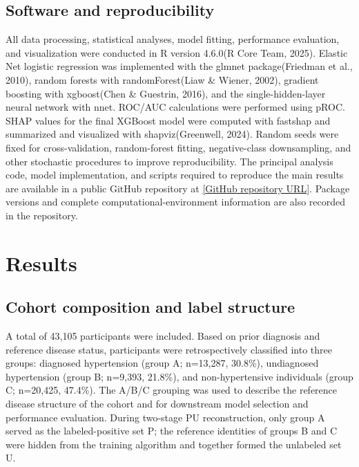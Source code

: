\documentclass[10pt]{article}
\begin{document}
\subsection{Software and
reproducibility}\label{software-and-reproducibility}

All data processing, statistical analyses, model fitting, performance
evaluation, and visualization were conducted in R version 4.6.0(R Core
Team, 2025). Elastic Net logistic regression was implemented with the
glmnet package(Friedman et al., 2010), random forests with
randomForest(Liaw \& Wiener, 2002), gradient boosting with xgboost(Chen
\& Guestrin, 2016), and the single-hidden-layer neural network with
nnet. ROC/AUC calculations were performed using pROC. SHAP values for
the final XGBoost model were computed with fastshap and summarized and
visualized with shapviz(Greenwell, 2024). Random seeds were fixed for
cross-validation, random-forest fitting, negative-class downsampling,
and other stochastic procedures to improve reproducibility. The
principal analysis code, model implementation, and scripts required to
reproduce the main results are available in a public GitHub repository
at
\href{https://github.com/LionelWu11282562/A-Two-Stage-Probability-Stratified-Method-for-Ambiguous-Dataset-Optimization}{{[}GitHub
repository URL{]}}. Package versions and complete
computational-environment information are also recorded in the
repository.

\section{Results}

\subsection{Cohort composition and label structure}

A total of 43,105 participants were included. Based on prior diagnosis
and reference disease status, participants were retrospectively
classified into three groups: diagnosed hypertension (group A; n=13,287,
30.8\%), undiagnosed hypertension (group B; n=9,393, 21.8\%), and
non-hypertensive individuals (group C; n=20,425, 47.4\%). The A/B/C
grouping was used to describe the reference disease structure of the
cohort and for downstream model selection and performance evaluation.
During two-stage PU reconstruction, only group A served as the
labeled-positive set P; the reference identities of groups B and C were
hidden from the training algorithm and together formed the unlabeled set
U.
\end{document}
